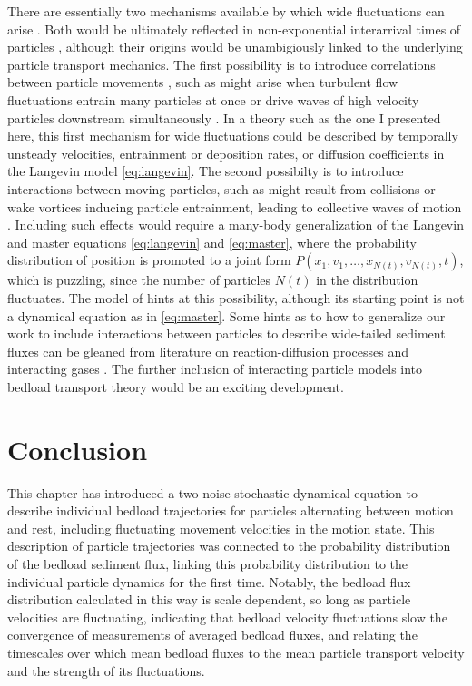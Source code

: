 There are essentially two mechanisms available by which wide fluctuations can arise \citep{Goh2008}. Both would be ultimately reflected in non-exponential interarrival times of particles \citep[e.g.][]{Turowski2010,Heyman2013}, although their origins would be unambigiously linked to the underlying particle transport mechanics.
The first possibility is to introduce correlations between particle movements \citep{Ancey2008,Heyman2013,Ancey2014}, such as might arise when turbulent flow fluctuations entrain many particles at once \citep{Cameron2020} or drive waves of high velocity particles downstream simultaneously \citep{Nino1996}. 
In a theory such as the one I presented here, this first mechanism for wide fluctuations could be described by temporally unsteady velocities, entrainment or deposition rates, or diffusion coefficients in the Langevin model \ref{eq:langevin}.
The second possibilty is to introduce interactions between moving particles, such as might result from collisions \citep{Lee2018} or wake vortices \citep{Schmeeckle2014} inducing particle entrainment, leading to collective waves of motion \citep{Ancey2014}.
Including such effects would require a many-body generalization of the Langevin and master equations \ref{eq:langevin} and \ref{eq:master}, where the probability distribution of position is promoted to a joint form $P(x_1,v_1,\dots,x_{N(t)},v_{N(t)},t)$, which is puzzling, since the number of particles $N(t)$ in the distribution fluctuates.
The model of \citet{Ancey2014} hints at this possibility, although its starting point is not a dynamical equation as in \ref{eq:master}.
Some hints as to how to generalize our work to include interactions between particles to describe wide-tailed sediment fluxes can be gleaned from literature on reaction-diffusion processes \citep{Hernandez2004,Cardy2006} and interacting gases \citep{Chapman1970,Brilliantov2004}. The further inclusion of interacting particle models into bedload transport theory would be an exciting development.

\section{Conclusion \label{sec:conc}} 
 
This chapter has introduced a two-noise stochastic dynamical equation to describe individual bedload trajectories for particles alternating between motion and rest, including fluctuating movement velocities in the motion state. This description of particle trajectories was connected to the probability distribution of the bedload sediment flux, linking this probability distribution to the individual particle dynamics for the first time.
Notably, the bedload flux distribution calculated in this way is scale dependent, so long as particle velocities are fluctuating, indicating that bedload velocity fluctuations slow the convergence of measurements of averaged bedload fluxes, and relating the timescales over which mean bedload fluxes to the mean particle transport velocity and the strength of its fluctuations.

